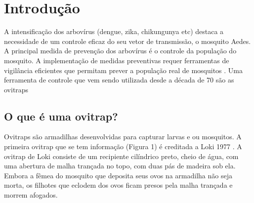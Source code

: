 \documentclass[
	12pt,				%
	openright,			%
	oneside,			%
	a4paper,			%
	chapter=TITLE,		%
	english,			%
	brazil				%
	]{abntex2}
\begin{document}
\textual

\setcounter{page}{12}

\chapter{Introdução}
A intensificação dos arbovírus (dengue, zika, chikungunya etc) destaca a necessidade de
um controle eficaz do seu vetor de transmissão, o mosquito Aedes. A principal
medida de prevenção dos arbovírus é o controle da população do mosquito. A
implementação de medidas preventivas requer ferramentas de vigilância eficientes que
permitam prever a população real de mosquitos \cite{ISMALIZA2019}. Uma ferramenta de controle que vem
sendo utilizada desde a década de 70 são as ovitraps \cite{LOK1977}

\section{O que é uma ovitrap?}

Ovitraps são armadilhas desenvolvidas para capturar larvas e ou mosquitos. A primeira ovitrap que se tem informação (Figura 1) é creditada a 
Loki 1977 \cite{LOK1977}. A ovitrap de Loki consiste de um recipiente cilíndrico preto, cheio de água,
com uma abertura de malha trançada no topo, com duas pás de madeira sob ela. Embora a
fêmea do mosquito que deposita seus ovos na armadilha não seja morta, os filhotes que
eclodem dos ovos ficam presos pela malha trançada e morrem afogados.
\end{document}
